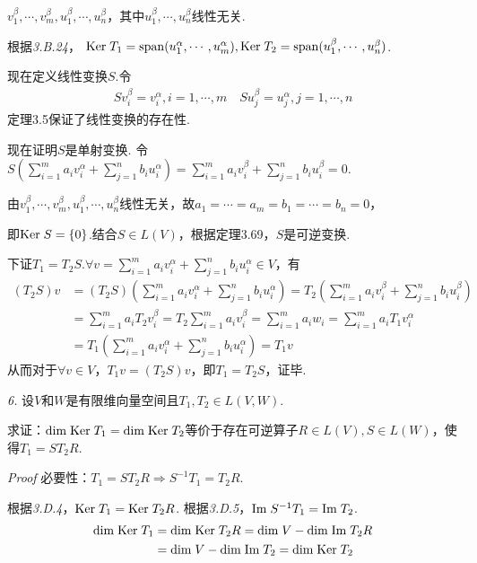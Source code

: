 \(v_1^\beta,\cdots,v_m^\beta,u_1^\beta,\cdots,u_n^\beta\)，其中\(u_1^\beta,\cdots,u_n^\beta\)线性无关.

根据\textit{3.B.24}，
\(\mathrm{Ker \;} T_1=\mathrm{span} (u_1^\alpha,\cdots,u_m^\alpha),\mathrm{Ker \;} T_2=\mathrm{span} (u_1^\beta,\cdots,u_n^\beta)\).

现在定义线性变换\(S\).令
    \begin{align*}
        Sv_i^\beta=v_i^\alpha,i=1,\cdots,m \quad
        Su_j^\beta=u_j^\alpha,j=1,\cdots,n
    \end{align*}
定理3.5保证了线性变换的存在性.

现在证明\(S\)是单射变换.
令\(S(\sum_{i=1}^m a_iv_i^\alpha+\sum_{j=1}^n b_iu_i^\alpha)=\sum_{i=1}^m a_iv_i^\beta+\sum_{j=1}^n b_iu_i^\beta=0\).

由\(v_1^\beta,\cdots,v_m^\beta,u_1^\beta,\cdots,u_n^\beta\)线性无关，故\(a_1=\cdots=a_m=b_1=\cdots=b_n=0\)，

即\(\mathrm{Ker \;} S=\{0\}\).结合\(S \in L(V)\)，根据定理3.69，\(S\)是可逆变换.

下证\(T_1=T_2S\).\(\forall v=\sum_{i=1}^m a_iv_i^\alpha+\sum_{j=1}^n b_iu_i^\alpha \in V\)，有
    \begin{align*}
        (T_2S)v&=(T_2S)(\sum_{i=1}^m a_iv_i^\alpha+\sum_{j=1}^n b_iu_i^\alpha )
                =T_2(\sum_{i=1}^m a_iv_i^\beta+\sum_{j=1}^n b_iu_i^\beta ) \\
            &=\sum_{i=1}^m a_iT_2v_i^\beta=T_2\sum_{i=1}^m a_iv_i^\beta
                =\sum_{i=1}^m a_iw_i=\sum_{i=1}^m a_iT_1v_i^\alpha \\
            &=T_1(\sum_{i=1}^m a_iv_i^\alpha+\sum_{j=1}^n b_iu_i^\alpha)=T_1v
    \end{align*}
从而对于\(\forall v \in V\)，\(T_1v=(T_2S)v\)，即\(T_1=T_2S\)，证毕.

\newpage

\textit{6.}
设\(V\)和\(W\)是有限维向量空间且\(T_1,T_2 \in L(V,W)\).

求证：\(\mathrm{dim \;} \mathrm{Ker \;} T_1=\mathrm{dim \;} \mathrm{Ker \;} T_2\)等价于存在可逆算子\(R \in L(V),S \in L(W)\)，使得\(T_1=ST_2R\).

\textit{Proof}
必要性：\(T_1=ST_2R \Rightarrow S^{-1}T_1=T_2R\).

根据\textit{3.D.4}，\(\mathrm{Ker \;} T_1=\mathrm{Ker \;} T_2R\).
根据\textit{3.D.5}，\(\mathrm{Im \;} S^{-1}T_1=\mathrm{Im \;} T_2\).
    \begin{align*}
        \mathrm{dim \;} \mathrm{Ker \;} T_1 &=\mathrm{dim \;} \mathrm{Ker \;} T_2R=\mathrm{dim \;} V-\mathrm{dim \;} \mathrm{Im \;} T_2R \\
        &=\mathrm{dim \;} V-\mathrm{dim \;} \mathrm{Im \;} T_2=\mathrm{dim \;} \mathrm{Ker \;} T_2
    \end{align*}

